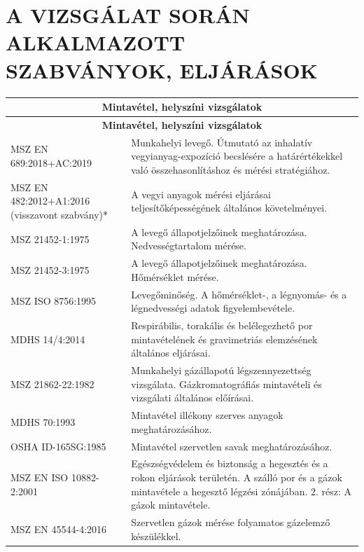 \documentclass[a4paper,12pt]{article}
\renewcommand{\arraystretch}{0.5}
\begin{document}
	
	\newpage
	\section{A VIZSGÁLAT SORÁN ALKALMAZOTT SZABVÁNYOK, ELJÁRÁSOK}
	
		\renewcommand{\arraystretch}{1.1} %
		\footnotesize %
		
		\begin{longtable}{|p{5cm}|p{10cm}|}
			\hline
			\multicolumn{2}{|c|}{\textbf{Mintavétel, helyszíni vizsgálatok}} \\ 
			\hline
			\endfirsthead
			
			\multicolumn{2}{|c|}{\textbf{Mintavétel, helyszíni vizsgálatok}} \\ 
			\hline
			\endhead
			
			\endfoot
			
			\hline
			\endlastfoot
			
			MSZ EN 689:2018+AC:2019 & Munkahelyi levegő. Útmutató az inhalatív vegyianyag-expozíció becslésére a határértékekkel való összehasonlításhoz és mérési stratégiához. \\ 
			\hline
			MSZ EN 482:2012+A1:2016 (visszavont szabvány)* & A vegyi anyagok mérési eljárásai teljesítőképességének általános követelményei. \\ 
			\hline
			MSZ 21452-1:1975 & A levegő állapotjelzőinek meghatározása. Nedvességtartalom mérése. \\ 
			\hline
			MSZ 21452-3:1975 & A levegő állapotjelzőinek meghatározása. Hőmérséklet mérése. \\ 
			\hline
			MSZ ISO 8756:1995 & Levegőminőség. A hőmérséklet-, a légnyomás- és a légnedvességi adatok figyelembevétele. \\ 
			\hline
			MDHS 14/4:2014 & Respirábilis, torakális és belélegezhető por mintavételének és gravimetriás elemzésének általános eljárásai. \\ 
			\hline
			MSZ 21862-22:1982 & Munkahelyi gázállapotú légszennyezettség vizsgálata. Gázkromatográfiás mintavételi és vizsgálati általános előírásai. \\ 
			\hline
			MDHS 70:1993 & Mintavétel illékony szerves anyagok meghatározásához. \\ 
			\hline
			OSHA ID-165SG:1985 & Mintavétel szervetlen savak meghatározásához. \\ 
			\hline
			MSZ EN ISO 10882-2:2001 & Egészségvédelem és biztonság a hegesztés és a rokon eljárások területén. A szálló por és a gázok mintavétele a hegesztő légzési zónájában. 2. rész: A gázok mintavétele. \\ 
			\hline
			MSZ EN 45544-4:2016 & Szervetlen gázok mérése folyamatos gázelemző készülékkel. \\ 

		\end{longtable}
		
\end{document}
